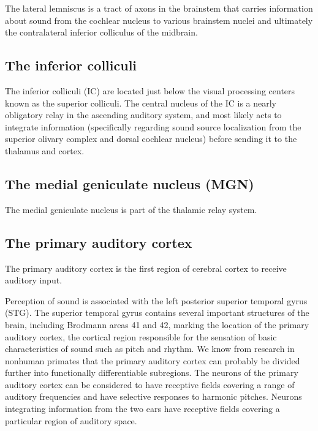 The lateral lemniscus is a tract of axons in the brainstem that carries information about sound from the cochlear nucleus to various brainstem nuclei and ultimately the contralateral inferior colliculus of the midbrain.

\hypertarget{the-inferior-colliculi}{%
\subsection{The inferior colliculi}\label{the-inferior-colliculi}}

The inferior colliculi (IC) are located just below the visual processing centers known as the superior colliculi. The central nucleus of the IC is a nearly obligatory relay in the ascending auditory system, and most likely acts to integrate information (specifically regarding sound source localization from the superior olivary complex and dorsal cochlear nucleus) before sending it to the thalamus and cortex.

\hypertarget{the-medial-geniculate-nucleus-mgn}{%
\subsection{The medial geniculate nucleus (MGN)}\label{the-medial-geniculate-nucleus-mgn}}

The medial geniculate nucleus is part of the thalamic relay system.

\hypertarget{the-primary-auditory-cortex}{%
\subsection{The primary auditory cortex}\label{the-primary-auditory-cortex}}

The primary auditory cortex is the first region of cerebral cortex to receive auditory input.

Perception of sound is associated with the left posterior superior temporal gyrus (STG). The superior temporal gyrus contains several important structures of the brain, including Brodmann areas 41 and 42, marking the location of the primary auditory cortex, the cortical region responsible for the sensation of basic characteristics of sound such as pitch and rhythm. We know from research in nonhuman primates that the primary auditory cortex can probably be divided further into functionally differentiable subregions. The neurons of the primary auditory cortex can be considered to have receptive fields covering a range of auditory frequencies and have selective responses to harmonic pitches. Neurons integrating information from the two ears have receptive fields covering a particular region of auditory space.

